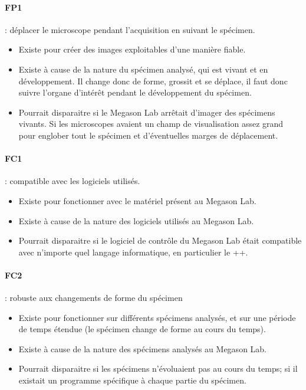 \paragraph*{FP1} : déplacer le microscope pendant l'acquisition en suivant le spécimen.
\begin{itemize}
  \item Existe pour créer des images exploitables d'une manière fiable.
  \item Existe à cause de la nature du spécimen analysé, qui est vivant et en développement. 
  Il change donc de forme, grossit et se déplace, il faut donc suivre l'organe d'intérêt pendant le
  développement du spécimen.
  \item Pourrait disparaitre si le Megason Lab arrêtait d'imager des spécimens vivants.
  Si les microscopes avaient un champ de visualisation assez grand pour englober
  tout le spécimen et d'éventuelles marges de déplacement.
\end{itemize}

\paragraph*{FC1} : compatible avec les logiciels utilisés.
\begin{itemize}
  \item Existe pour fonctionner avec le matériel présent au Megason Lab.
  \item Existe à cause de la nature des logiciels utilisés au Megason Lab.
  \item Pourrait disparaitre si le logiciel de contrôle du Megason Lab était compatible avec n'importe quel langage informatique,
  en particulier le {\C++}.
\end{itemize}

\paragraph*{FC2} : robuste aux changements de forme du spécimen
\begin{itemize}
  \item Existe pour fonctionner sur différents spécimens analysés,
  et sur une période de temps étendue (le spécimen change de forme au cours du temps).
  \item Existe à cause de la nature des spécimens analysés au Megason Lab.
  \item Pourrait disparaitre si les spécimens n'évoluaient pas au cours du temps;
  si il existait un programme spécifique à chaque partie du spécimen.
\end{itemize}

